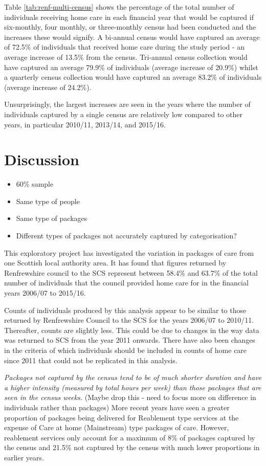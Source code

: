 \documentclass[]{article}
\providecommand{\tightlist}{%
  \setlength{\itemsep}{0pt}\setlength{\parskip}{0pt}}
\begin{document}
Table \ref{tab:renf-multi-census} shows the percentage of the total
number of individuals receiving home care in each financial year that
would be captured if six-monthly, four monthly, or three-monthly census
had been conducted and the increases these would signify. A bi-annual
census would have captured an average of 72.5\% of individuals that
received home care during the study period - an average increase of
13.5\% from the census. Tri-annual census collection would have captured
an average 79.9\% of individuals (average increase of 20.9\%) whilst a
quarterly census collection would have captured an average 83.2\% of
individuals (average increase of 24.2\%).

Unsurprisingly, the largest increases are seen in the years where the
number of individuals captured by a single census are relatively low
compared to other years, in particular 2010/11, 2013/14, and 2015/16.

\section{Discussion}\label{sec:renf-discuss}

\begin{itemize}
\tightlist
\item
  60\% sample
\item
  Same type of people
\item
  Same type of packages
\item
  Different types of packages not accurately captured by categorisation?
\end{itemize}

This exploratory project has investigated the variation in packages of
care from one Scottish local authority area. It has found that figures
returned by Renfrewshire council to the SCS represent between 58.4\% and
63.7\% of the total number of individuals that the council provided home
care for in the financial years 2006/07 to 2015/16.

Counts of individuals produced by this analysis appear to be similar to
those returned by Renfrewshire Council to the SCS for the years 2006/07
to 2010/11. Thereafter, counts are slightly less. This could be due to
changes in the way data was returned to SCS from the year 2011 onwards.
There have also been changes in the criteria of which individuals should
be included in counts of home care since 2011 that could not be
replicated in this analysis.

\emph{Packages not captured by the census tend to be of much shorter
duration and have a higher intensity (measured by total hours per week)
than those packages that are seen in the census weeks.} (Maybe drop this
- need to focus more on difference in individuals rather than packages)
More recent years have seen a greater proportion of packages being
delivered for Reablement type services at the expense of Care at home
(Mainstream) type packages of care. However, reablement services only
account for a maximum of 8\% of packages captured by the census and
21.5\% not captured by the census with much lower proportions in earlier
years.
\end{document}
